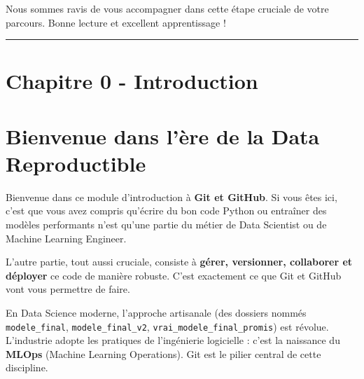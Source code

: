 \documentclass[
  letterpaper,
  DIV=11,
  numbers=noendperiod]{scrreprt}
\begin{document}
Nous sommes ravis de vous accompagner dans cette étape cruciale de votre
parcours. Bonne lecture et excellent apprentissage ! 🚀

\begin{center}\rule{0.5\linewidth}{0.5pt}\end{center}


\section{Chapitre 0 - Introduction}\label{chapitre-0---introduction}


\section{Bienvenue dans l'ère de la Data
Reproductible}\label{bienvenue-dans-luxe8re-de-la-data-reproductible}

Bienvenue dans ce module d'introduction à \textbf{Git et GitHub}. Si
vous êtes ici, c'est que vous avez compris qu'écrire du bon code Python
ou entraîner des modèles performants n'est qu'une partie du métier de
Data Scientist ou de Machine Learning Engineer.

L'autre partie, tout aussi cruciale, consiste à \textbf{gérer,
versionner, collaborer et déployer} ce code de manière robuste. C'est
exactement ce que Git et GitHub vont vous permettre de faire.

\begin{tcolorbox}[enhanced jigsaw, arc=.35mm, bottomrule=.15mm, bottomtitle=1mm, breakable, colback=white, colbacktitle=quarto-callout-tip-color!10!white, colframe=quarto-callout-tip-color-frame, coltitle=black, left=2mm, leftrule=.75mm, opacityback=0, opacitybacktitle=0.6, rightrule=.15mm, title=\textcolor{quarto-callout-tip-color}{\faLightbulb}\hspace{0.5em}{L'état d'esprit (Mindset) MLOps}, titlerule=0mm, toprule=.15mm, toptitle=1mm]

En Data Science moderne, l'approche artisanale (des dossiers nommés
\texttt{modele\_final}, \texttt{modele\_final\_v2},
\texttt{vrai\_modele\_final\_promis}) est révolue. L'industrie adopte
les pratiques de l'ingénierie logicielle : c'est la naissance du
\textbf{MLOps} (Machine Learning Operations). Git est le pilier central
de cette discipline.

\end{tcolorbox}
\end{document}
